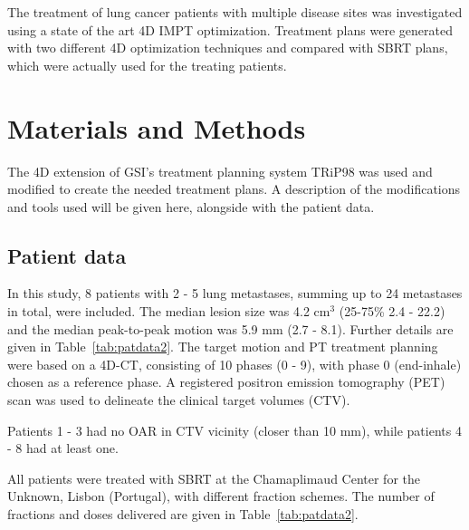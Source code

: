 The treatment of lung cancer patients  with multiple disease sites was investigated using a state of the art 4D IMPT optimization. 
Treatment plans were generated with two different 4D optimization techniques and compared with SBRT plans, which were actually used for the treating patients.



\section{Materials and Methods}

The 4D extension of GSI's treatment planning system TRiP98 \cite{Kraemer2000a, Richter2013} was used and modified to create the needed treatment plans. A description of the modifications and tools used will be given here, 
alongside with the patient data.

\subsection{Patient data}


In this study, 8 patients with 2 - 5 lung metastases, summing up to 24 metastases in total, were included. The median lesion size was 4.2 cm$^3$ (25-75\% 2.4 - 22.2) and the median peak-to-peak motion was 5.9 mm (2.7 - 8.1). 
Further details are given in Table~\ref{tab:patdata2}.
The target motion and PT treatment planning were based on a 4D-CT, consisting of 10 phases (0 - 9), with phase 0 (end-inhale) chosen as a reference phase.
A registered positron emission tomography (PET) scan was used to delineate the clinical target volumes (CTV). 

Patients 1 - 3 had no OAR in CTV vicinity (closer than 10 mm), while patients 4 - 8 had at least one.

All patients were treated with SBRT at the Chamaplimaud Center for the Unknown, Lisbon (Portugal), with different fraction schemes. 
The number of fractions and doses delivered are given in Table~\ref{tab:patdata2}.

